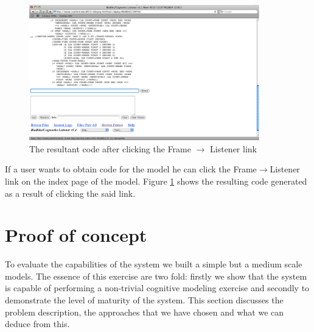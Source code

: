 \begin{figure}[htp]
  \centering
  \includegraphics[width=100mm]{ConvertFrameToImage}
  \caption{The resultant code after clicking the Frame $\rightarrow$ Listener
    link}
  \label{ConvertFrameToImage}
\end{figure}

If a user wants to obtain code for the model he can click the
Frame$\rightarrow$Listener link on the index page of the model. Figure
\ref{ConvertFrameToImage} shows the resulting code generated as a
result of clicking the said link.


\section{Proof of concept}





To evaluate the capabilities of the system we built a simple but a
medium scale models. The essence of this exercise are two fold:
firstly we show that the system is capable of performing a non-trivial
cognitive modeling exercise and secondly to demonstrate the level of
maturity of the system. This section discusses the problem description,
the approaches that we have chosen and what we can deduce from this.

